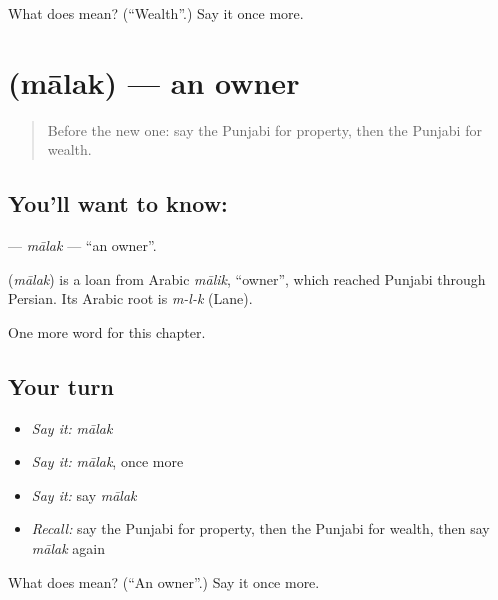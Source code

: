 \begin{tcolorbox}[breakable,colback=teal!4,colframe=teal!35!black,title={Before you move on}]
What does  mean? (\textquotedblleft{}Wealth\textquotedblright{}.) Say it once more.
\end{tcolorbox}
\section[\texorpdfstring{\pa{ਮਾਲਕ} (mālak)}{ਮਾਲਕ (mālak)}]{ (mālak) — an owner}

\label{lesson:PA-C111-malak}



\begin{quote}
Before the new one: say the Punjabi for property, then the Punjabi for wealth.
\end{quote}

\subsection*{You'll want to know: }
\textbf{} — \emph{mālak} — \textquotedblleft{}an owner\textquotedblright{}.

\begin{cousinweb}
\textbf{} (\emph{mālak}) is a loan from Arabic \emph{mālik}, \textquotedblleft{}owner\textquotedblright{}, which reached Punjabi through Persian. Its Arabic root is \emph{m-l-k} (Lane).
\end{cousinweb}

\begin{grammarlens}[title={What you've built}]
One more word for this chapter.
\end{grammarlens}

\subsection*{Your turn}
\begin{itemize}
\raggedright
  \item \emph{Say it:} \emph{mālak}
  \item \emph{Say it:} \emph{mālak}, once more
  \item \emph{Say it:} say \emph{mālak}
  \item \emph{Recall:} say the Punjabi for property, then the Punjabi for wealth, then say \emph{mālak} again
\end{itemize}

\begin{tcolorbox}[breakable,colback=teal!4,colframe=teal!35!black,title={Before you move on}]
What does  mean? (\textquotedblleft{}An owner\textquotedblright{}.) Say it once more.
\end{tcolorbox}
